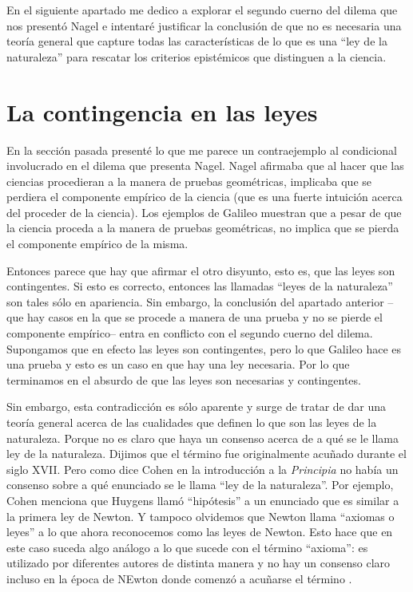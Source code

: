 En el siguiente apartado me dedico a explorar el segundo cuerno del dilema que nos presentó Nagel e intentaré justificar la conclusión de que no es necesaria una teoría general que capture todas las características de lo que es una ``ley de la naturaleza'' para rescatar los criterios epistémicos que distinguen a la ciencia.

\section{La contingencia en las leyes}

\noindent En la sección pasada presenté lo que me parece un contraejemplo al condicional involucrado en el dilema que presenta Nagel. Nagel afirmaba que al hacer que las ciencias procedieran a la manera de pruebas geométricas, implicaba que se perdiera el componente empírico de la ciencia (que es una fuerte intuición acerca del proceder de la ciencia). Los ejemplos de Galileo muestran que a pesar de que la ciencia proceda a la manera de pruebas geométricas, no implica que se pierda el componente empírico de la misma.

Entonces parece que hay que afirmar el otro disyunto, esto es, que las leyes son contingentes. Si esto es correcto, entonces las llamadas ``leyes de la naturaleza'' son tales sólo en apariencia. Sin embargo, la conclusión del apartado anterior --que hay casos  en la que se procede a manera de una prueba y no se pierde el componente empírico-- entra en conflicto con el segundo cuerno del dilema. Supongamos que en efecto las leyes son contingentes, pero lo que Galileo hace es una prueba y esto es un caso en que hay una ley necesaria. Por lo que terminamos en el absurdo de que las leyes son necesarias y contingentes.

Sin embargo, esta contradicción es sólo aparente y surge de tratar de dar una teoría general acerca de las cualidades que definen lo que son las leyes de la naturaleza. Porque no es claro que haya un consenso acerca de a qué se le llama ley de la naturaleza. Dijimos que el término fue originalmente acuñado durante el siglo XVII. Pero como dice Cohen en la introducción a la \textit{Principia} \cite{principia} no había un consenso sobre a qué enunciado se le llama ``ley de la naturaleza''. Por ejemplo, Cohen menciona que Huygens llamó ``hipótesis'' a un enunciado que es similar a la primera ley de Newton. Y tampoco olvidemos que Newton llama ``axiomas o leyes'' a lo que ahora reconocemos como las leyes de Newton. Esto hace que en este caso suceda algo análogo a lo que sucede con el término ``axioma'': es utilizado por diferentes autores de distinta manera y no hay un consenso claro incluso en la época de NEwton donde comenzó a acuñarse el término \cite{heath2015}.

